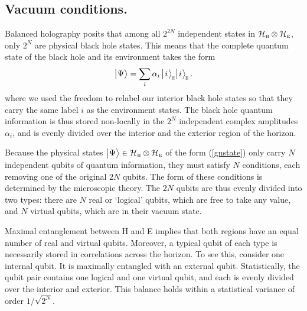 \documentclass[aps,prd,twocolumn,nofootinbib,superscriptaddress,amssymb]{revtex4}
\def\be{\begin{equation}}
\def\ee{\end{equation}}
\begin{document}
\vspace{-3mm}

\subsection{Vacuum conditions. }

\vspace{-3mm}



Balanced holography posits that among all $2^{2N}$  independent states in  ${\cal H}_{\mbox{\scriptsize \hspace{.5pt}\sc h}} \otimes {\cal H}_{\mbox{\scriptsize \hspace{.5pt}\sc e}}$, only $2^N$ are physical black hole states.
This means that the complete quantum state of the black hole and its environment takes the form 
\be
\label{gnstate}
\li \Psi \ra = \sum_{i}  \alpha_{i}\, \li \spc i \spc \ra_{\! \Hh} \li \spc i \spc \ra_{\! \Ee}\, .
\ee
where we used the freedom to relabel our interior black hole states so that they carry the same label $i$ as the environment states. The black hole quantum information is thus stored non-locally in the $2^N$ independent complex amplitudes $\alpha_i$, and is evenly divided over the interior and the exterior region of the horizon.  

Because the physical states $\bigl|\hspace{.5pt} \Psi\bigr\rangle \in {\cal H}_{\mbox{\scriptsize \hspace{.5pt}\sc h}} \otimes {\cal H}_{\mbox{\scriptsize \hspace{.5pt}\sc e}}$ of the form (\ref{gnstate}) only carry $N$ independent qubits of quantum information, they must satisfy $N$  conditions, each removing one of the original $2N$ qubits. The form of  these conditions is determined by the microscopic theory.  The $2N$ qubits are thus evenly divided into two types: there are $N$ real or `logical' qubits, which are free to take any value, %
and $N$ virtual qubits, which are in their vacuum state. 

Maximal entanglement between H and E implies that both regions have an equal number of real and virtual qubits.
Moreover, a typical qubit of each type is necessarily stored in correlations across the horizon. To see this,
consider one internal qubit. It is maximally entangled with an external qubit. Statistically, the  qubit pair contains one logical
 and one virtual qubit, and  each is evenly divided over the interior and exterior.
This balance holds within a statistical variance of order $1/{\sqrt{2^N}}$. 
\end{document}

